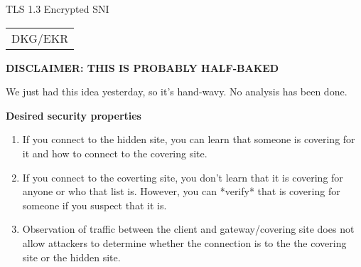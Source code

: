 \documentclass[helvetica]{seminar}
\newcommand{\heading}[1]{%
  \begin{center} 
    \large\bf 
    #1 
  \end{center} 
  \vspace{.4 in}}
\begin{document}
\begin{slide}
\begin{center}
\vspace{.5 in}
\LARGE{{\bf}TLS 1.3 Encrypted SNI}\\
\vspace{.2in}
\large{
\begin{tabular}{c}
DKG/EKR
\end{tabular}
}
\end{center}

\end{slide}

\begin{slide}
\heading{DISCLAIMER: THIS IS PROBABLY HALF-BAKED}

We just had this idea yesterday, so it's hand-wavy. No analysis has been done.
\end{slide}


\centerslidesfalse 

\begin{slide}
\heading{Desired security properties}

\begin{enumerate}
\item If you connect to the hidden site, you can learn that someone is covering
   for it and how to connect to the covering site.
\item If you connect to the coverting site, you don't learn that it is covering
   for anyone or who that list is. However, you can *verify* that is covering
   for someone if you suspect that it is.
\item Observation of traffic between the client and gateway/covering site does not allow attackers
   to determine whether the connection is to the the covering site or the
   hidden site.
\end{enumerate}

\end{slide}
\end{document}
